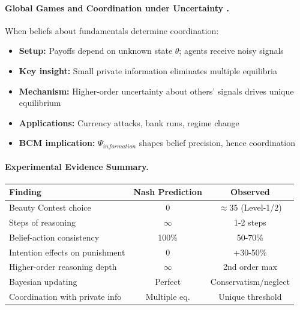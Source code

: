 \paragraph{Global Games and Coordination under Uncertainty \citep{carlssonvanDamme1993, morrishin2003}.}
When beliefs about fundamentals determine coordination:
\begin{itemize}[nosep]
    \item \textbf{Setup:} Payoffs depend on unknown state $\theta$; agents receive noisy signals
    \item \textbf{Key insight:} Small private information eliminates multiple equilibria
    \item \textbf{Mechanism:} Higher-order uncertainty about others' signals drives unique equilibrium
    \item \textbf{Applications:} Currency attacks, bank runs, regime change
    \item \textbf{BCM implication:} $\Psi_{information}$ shapes belief precision, hence coordination
\end{itemize}

\paragraph{Experimental Evidence Summary.}
\begin{center}
\small
\begin{tabular}{@{}lcc@{}}
\toprule
\textbf{Finding} & \textbf{Nash Prediction} & \textbf{Observed} \\
\midrule
Beauty Contest choice & 0 & $\approx$35 (Level-1/2) \\
Steps of reasoning & $\infty$ & 1-2 steps \\
Belief-action consistency & 100\% & 50-70\% \\
Intention effects on punishment & 0 & +30-50\% \\
Higher-order reasoning depth & $\infty$ & 2nd order max \\
Bayesian updating & Perfect & Conservatism/neglect \\
Coordination with private info & Multiple eq. & Unique threshold \\
\bottomrule
\end{tabular}
\end{center}

